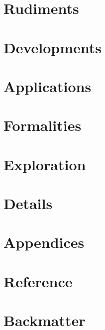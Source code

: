 \documentclass[theoremb]{gsm-l}
\begin{document}
\part{Rudiments}





\part{Developments}






\part{Applications}



\part{Formalities}




\part{Exploration}





\part{Details}
%
%


\part{Appendices}
\appendix






\part{Reference}


\part{Backmatter}
\backmatter
%


\printindex
\end{document}
